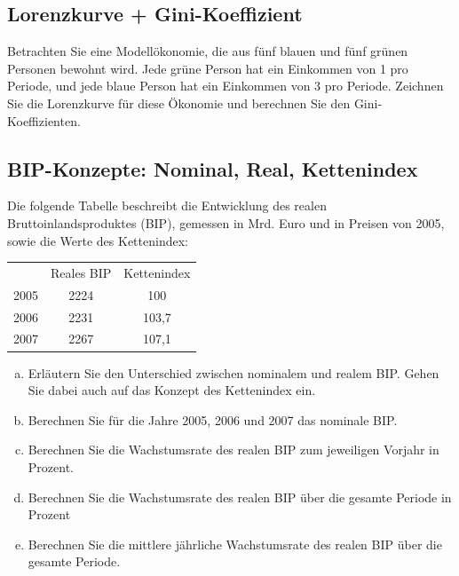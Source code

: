 \documentclass{scrartcl}
\begin{document}
\subsection{Lorenzkurve + Gini-Koeffizient}
Betrachten Sie eine Modell\"{o}konomie, die aus f\"{u}nf blauen und f\"{u}nf gr\"{u}nen Personen bewohnt wird. Jede gr\"{u}ne Person hat ein Einkommen von 1 pro Periode, und jede blaue Person hat ein Einkommen von 3 pro Periode. Zeichnen Sie die Lorenzkurve f\"{u}r diese \"{O}konomie und berechnen Sie den Gini-Koeffizienten.

\subsection{BIP-Konzepte: Nominal, Real, Kettenindex}
Die folgende Tabelle beschreibt die Entwicklung des realen Bruttoinlandsproduktes (BIP), gemessen
in Mrd. Euro und in Preisen von 2005, sowie die Werte des Kettenindex:
\begin{center}
\begin{tabular}{|c|c|c|}
  \hline
   & Reales BIP & Kettenindex \\
  2005 & 2224 & 100 \\
  2006 & 2231 & 103,7 \\
  2007 & 2267 & 107,1 \\
  \hline
\end{tabular}
\end{center}
\begin{enumerate}[a)]
  \item Erl\"{a}utern Sie den Unterschied zwischen nominalem und realem BIP. Gehen Sie dabei auch auf das Konzept des Kettenindex ein.
  \item Berechnen Sie f\"{u}r die Jahre 2005, 2006 und 2007 das nominale BIP.
  \item Berechnen Sie die Wachstumsrate des realen BIP zum jeweiligen Vorjahr in Prozent.
  \item Berechnen Sie die Wachstumsrate des realen BIP \"{u}ber die gesamte Periode in Prozent
  \item Berechnen Sie die mittlere j\"{a}hrliche Wachstumsrate des realen BIP \"{u}ber die gesamte Periode.
\end{enumerate}
\end{document}
